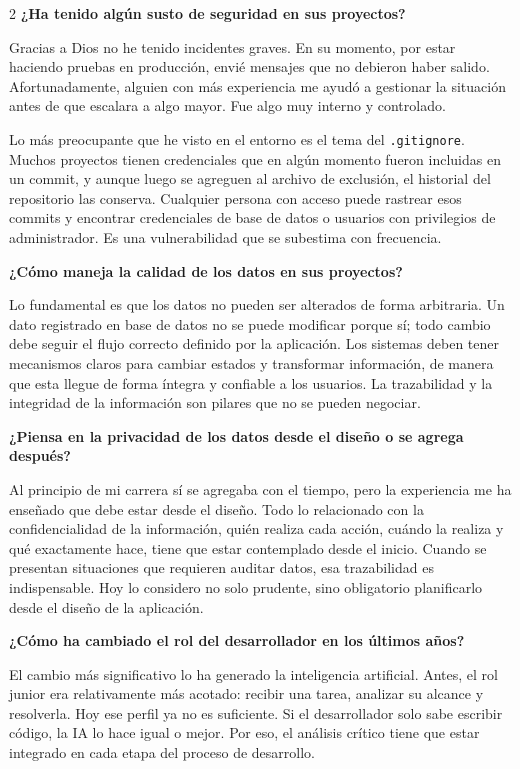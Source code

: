 \documentclass[10pt,spanish,Letterpaper,openany]{book}
\let\origtextbf\textbf
\renewcommand{\textbf}[1]{{\color{textlinetitle}\origtextbf{#1}}}
\begin{document}
\begin {multicols}{2}
\textbf{¿Ha tenido algún susto de seguridad en sus proyectos?}

Gracias a Dios no he tenido incidentes graves. En su momento, por estar haciendo pruebas en producción, envié mensajes que no debieron haber salido. Afortunadamente, alguien con más experiencia me ayudó a gestionar la situación antes de que escalara a algo mayor. Fue algo muy interno y controlado.

Lo más preocupante que he visto en el entorno es el tema del \texttt{.gitignore}. Muchos proyectos tienen credenciales que en algún momento fueron incluidas en un commit, y aunque luego se agreguen al archivo de exclusión, el historial del repositorio las conserva. Cualquier persona con acceso puede rastrear esos commits y encontrar credenciales de base de datos o usuarios con privilegios de administrador. Es una vulnerabilidad que se subestima con frecuencia.

\textbf{¿Cómo maneja la calidad de los datos en sus proyectos?}

Lo fundamental es que los datos no pueden ser alterados de forma arbitraria. Un dato registrado en base de datos no se puede modificar porque sí; todo cambio debe seguir el flujo correcto definido por la aplicación. Los sistemas deben tener mecanismos claros para cambiar estados y transformar información, de manera que esta llegue de forma íntegra y confiable a los usuarios. La trazabilidad y la integridad de la información son pilares que no se pueden negociar.

\textbf{¿Piensa en la privacidad de los datos desde el diseño o se agrega después?}

Al principio de mi carrera sí se agregaba con el tiempo, pero la experiencia me ha enseñado que debe estar desde el diseño. Todo lo relacionado con la confidencialidad de la información, quién realiza cada acción, cuándo la realiza y qué exactamente hace, tiene que estar contemplado desde el inicio. Cuando se presentan situaciones que requieren auditar datos, esa trazabilidad es indispensable. Hoy lo considero no solo prudente, sino obligatorio planificarlo desde el diseño de la aplicación.

\textbf{¿Cómo ha cambiado el rol del desarrollador en los últimos años?}

El cambio más significativo lo ha generado la inteligencia artificial. Antes, el rol junior era relativamente más acotado: recibir una tarea, analizar su alcance y resolverla. Hoy ese perfil ya no es suficiente. Si el desarrollador solo sabe escribir código, la IA lo hace igual o mejor. Por eso, el análisis crítico tiene que estar integrado en cada etapa del proceso de desarrollo.


\end{multicols}
\end{document}
